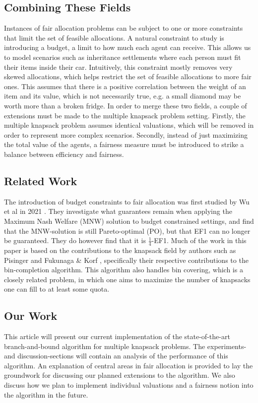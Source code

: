 \documentclass[b5paper]{article}
\begin{document}
\subsection{Combining These Fields}
Instances of fair allocation problems can be subject to one or more constraints that limit the set of feasible allocations.
A natural constraint to study is introducing a budget, a limit to how much each agent can receive.
This allows us to model scenarios such as inheritance settlements where each person must fit their items inside their car.
Intuitively, this constraint mostly removes very skewed allocations, which helps restrict the set of feasible allocations
to more fair ones. This assumes that there is a positive correlation between the weight of an item and its value, which is not necessarily true, e.g. a small diamond may be worth more than a broken fridge.
In order to merge these two fields, a couple of extensions must be made to the multiple knapsack problem setting.
Firstly, the multiple knapsack problem assumes identical valuations, which will be removed in order to represent more complex scenarios.
Secondly, instead of just maximizing the total value of the agents, a fairness measure must be introduced to strike a balance between efficiency and fairness.

\subsection{Related Work}
The introduction of budget constraints to fair allocation was first studied by Wu et al in 2021 \cite{wu_budget-feasible_2020}.
They investigate what guarantees remain when applying the Maximum Nash Welfare (MNW) solution to budget constrained settings,
and find that the MNW-solution is still Pareto-optimal (PO), but that EF1 can no longer be guaranteed. They do however find that it is \(\frac{1}{4}\)-EF1.
Much of the work in this paper is based on the contributions to the knapsack field by authors such as Pisinger \cite{pisinger_exact_nodate} and Fukunaga \& Korf \cite{fukunaga_bin_2007},
specifically their respective contributions to the bin-completion algorithm. 
This algorithm also handles bin covering, which is a closely related problem, in which one aims to maximize the number of knapsacks one can fill to at least some quota.

\subsection{Our Work}
This article will present our current implementation of the state-of-the-art branch-and-bound algorithm for multiple knapsack problems.
The experiments- and discussion-sections will contain an analysis of the performance of this algorithm.
An explanation of central areas in fair allocation is provided to lay the groundwork for discussing our planned extensions to the algorithm.
We also discuss how we plan to implement individual valuations and a fairness notion into the algorithm in the future.
\end{document}
